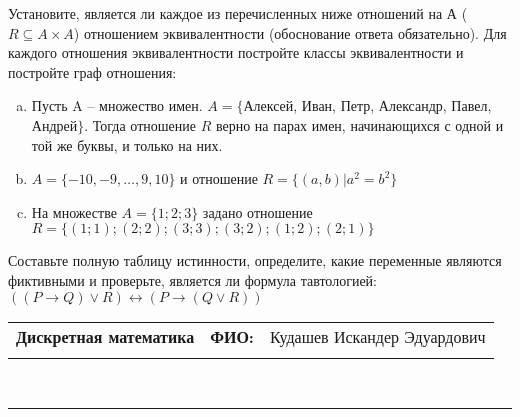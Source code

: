 \documentclass[10pt]{exam}
\newcommand{\class}{Дискретная математика}
\newcommand{\examdate}{}
\begin{document}
\begin{questions}
\question
Установите, является ли каждое из перечисленных ниже отношений на А ($R \subseteq A \times A$) отношением эквивалентности (обоснование ответа обязательно). Для каждого отношения эквивалентности постройте классы 
эквивалентности и постройте граф отношения:
\begin{enumerate} [a)]\setcounter{enumi}{0}
\item Пусть A – множество имен. $A = \{ $Алексей, Иван, Петр, Александр, Павел, Андрей$ \}$. Тогда отношение $R$ верно на парах имен, начинающихся с одной и той же буквы, и только на них.
\item $A = \{-10, -9, … , 9, 10\}$ и отношение $ R = \{(a,b)|a^{2} = b^{2}\}$
\item На множестве $A = \{1; 2; 3\}$ задано отношение $R = \{(1; 1); (2; 2); (3; 3); (3; 2); (1; 2); (2; 1)\}$
\end{enumerate}\question Составьте полную таблицу истинности, определите, какие переменные являются фиктивными и проверьте, является ли формула тавтологией:
$((P \rightarrow Q) \lor R) \leftrightarrow (P \rightarrow (Q \lor R))$

\end{questions}
\newpage
\begin{flushright}
\begin{tabular}{p{2.8in} r l}
\textbf{\class} & \textbf{ФИО:} &Кудашев Искандер Эдуардович
\\

\textbf{\examdate} &&\\
\end{tabular}\\
\end{flushright}
\rule[1ex]{\textwidth}{.1pt}
\end{document}
